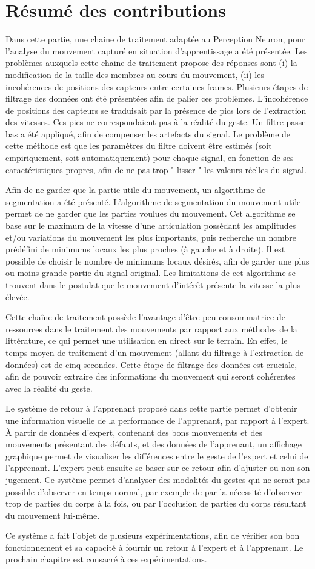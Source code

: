 \section{Résumé des contributions}
Dans cette partie, une chaine de traitement adaptée au Perception Neuron, pour l'analyse du mouvement capturé en situation d'apprentissage a été présentée. Les problèmes auxquels cette chaine de traitement propose des réponses sont (i) la modification de la taille des membres au cours du mouvement, (ii) les incohérences de positions des capteurs entre certaines frames. Plusieurs étapes de filtrage des données ont été présentées afin de palier ces problèmes. L'incohérence de positions des capteurs se traduisait par la présence de pics lors de l'extraction des vitesses. Ces pics ne correspondaient pas à la réalité du geste. Un filtre passe-bas a été appliqué, afin de compenser les artefacts du signal. Le problème de cette méthode est que les paramètres du filtre doivent être estimés (soit empiriquement, soit automatiquement) pour chaque signal, en fonction de ses caractéristiques propres, afin de ne pas trop " lisser " les valeurs réelles du signal.

Afin de ne garder que la partie utile du mouvement, un algorithme de segmentation a été présenté. L'algorithme de segmentation du mouvement utile permet de ne garder que les parties voulues du mouvement. Cet algorithme se base sur le maximum de la vitesse d'une articulation possédant les amplitudes et/ou variations du mouvement les plus importants, puis recherche un nombre prédéfini de minimums locaux les plus proches (à gauche et à droite). Il est possible de choisir le nombre de minimums locaux désirés, afin de garder une plus ou moins grande partie du signal original. Les limitations de cet algorithme se trouvent dans le postulat que le mouvement d'intérêt présente la vitesse la plus élevée.

Cette chaîne de traitement possède l'avantage d'être peu consommatrice de ressources dans le traitement des mouvements par rapport aux méthodes de la littérature, ce qui permet une utilisation en direct sur le terrain. En effet, le temps moyen de traitement d'un mouvement (allant du filtrage à l'extraction de données) est de cinq secondes. Cette étape de filtrage des données est cruciale, afin de pouvoir extraire des informations du mouvement qui seront cohérentes avec la réalité du geste.

Le système de retour à l'apprenant proposé dans cette partie permet d'obtenir une information visuelle de la performance de l'apprenant, par rapport à l'expert. À partir de données d'expert, contenant des bons mouvements et des mouvements présentant des défauts, et des données de l'apprenant, un affichage graphique permet de visualiser les différences entre le geste de l'expert et celui de l'apprenant. L'expert peut ensuite se baser sur ce retour afin d'ajuster ou non son jugement. Ce système permet d'analyser des modalités du gestes qui ne serait pas possible d'observer en temps normal, par exemple de par la nécessité d'observer trop de parties du corps à la fois, ou par l'occlusion de parties du corps résultant du mouvement lui-même.

Ce système a fait l'objet de plusieurs expérimentations, afin de vérifier son bon fonctionnement et sa capacité à fournir un retour à l'expert et à l'apprenant. Le prochain chapitre est consacré à ces expérimentations.